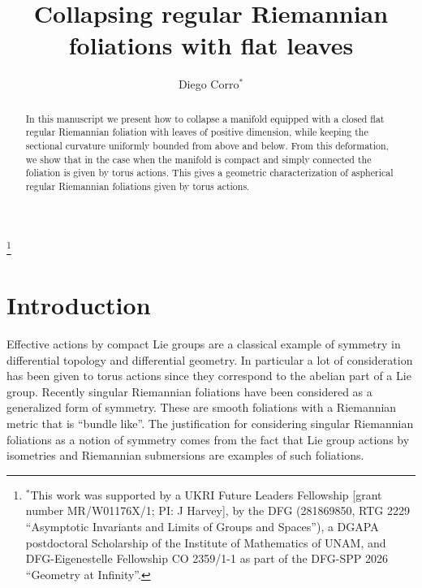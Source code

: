\documentclass[12pt,a4paper,reqno]{amsart}
\theoremstyle{definition}
\numberwithin{equation}{section}
\begin{document}
\title[Collapsing flat foliations]{Collapsing regular Riemannian foliations with flat leaves}

\author[D. CORRO]{Diego Corro$^{*}$}
\address[D. CORRO]{
Fakultät für Mathematik\\
Karslruher Institut für Technologie\\
Englerstr. 2\\
76131 Karlsruhe\\
Deuschland.
}
\thanks{$^{*}$This work was supported by a UKRI Future Leaders Fellowship [grant number MR/W01176X/1; PI: J Harvey], by the DFG (281869850, RTG 2229 ``Asymptotic Invariants and Limits of Groups and Spaces''), a DGAPA postdoctoral Scholarship of the Institute of Mathematics of UNAM, and DFG-Eigene\-stelle Fellowship CO 2359/1-1 as part of the DFG-SPP 2026 ``Geometry at Infinity''.}



\setlength{\overfullrule}{5pt}

\begin{abstract}
In this manuscript we present how to collapse a manifold equipped with a closed flat regular Riemannian foliation with leaves of positive dimension, while keeping the sectional curvature uniformly bounded from above and below. From this deformation, we show that  in the case when the manifold is compact and simply connected the foliation is given by torus actions. This gives a geometric characterization of aspherical regular Riemannian foliations given by torus actions.
\end{abstract}

\maketitle


%  


\section{Introduction}\label{S: Introduction}

Effective actions by compact Lie groups are a classical example of symmetry in differential topology and differential geometry. In particular a lot of consideration has been given to torus actions since they correspond to the abelian part of a Lie group. Recently singular Riemannian foliations have been considered as a generalized form of symmetry. These are smooth foliations with  a Riemannian metric that is ``bundle like''. The justification for considering singular Riemannian foliations as a notion of symmetry comes from the fact that Lie group actions by isometries and Riemannian submersions are examples of such foliations.
\end{document}
